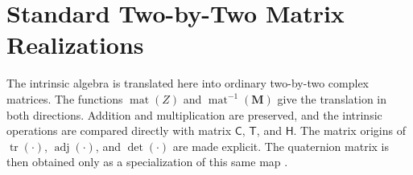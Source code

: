 \documentclass[10pt,letterpaper]{article}
\newcommand{\eqfunc}[1]{\operatorname{#1}}
\newcommand{\pv}[1]{#1}
\newcommand{\mat}[1]{\mathbf{#1}}
\newcommand{\Hop}{\mathsf H}
\newcommand{\detf}[1]{\eqfunc{det}\!\left(#1\right)}
\newcommand{\adjf}[1]{\eqfunc{adj}\!\left(#1\right)}
\newcommand{\matf}[1]{\eqfunc{mat}\!\left(#1\right)}
\newcommand{\matinvf}[1]{\eqfunc{mat}^{-1}\!\left(#1\right)}
\begin{document}


\clearpage
\appendix
\section{Standard Two-by-Two Matrix Realizations}\label{sec:matrix-appendix}
The intrinsic algebra is translated here into ordinary two-by-two complex
matrices. The functions \(\matf{\pv{Z}}\) and
\(\matinvf{\mat{M}}\) give the translation in both directions. Addition and
multiplication are preserved, and the intrinsic operations are compared
directly with matrix \(\mathsf C\), \(\mathsf T\), and \(\Hop\). The
matrix origins of \(\eqfunc{tr}(\cdot)\), \(\adjf{\cdot}\), and
\(\detf{\cdot}\) are made explicit. The quaternion matrix is then obtained
only as a specialization of this same map \cite{pauli1927}.


\end{document}
